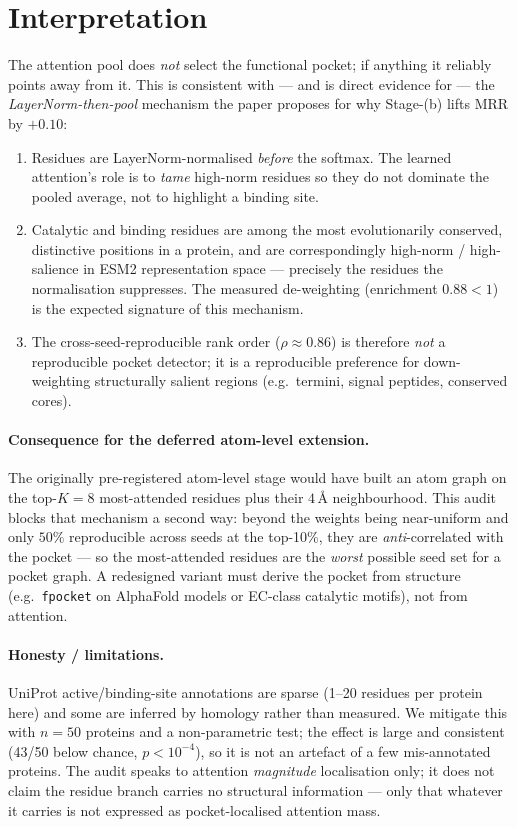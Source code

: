 \documentclass[11pt]{article}
\begin{document}
\section{Interpretation}

The attention pool does \emph{not} select the functional pocket; if anything it
reliably points away from it. This is consistent with --- and is direct
evidence for --- the \emph{LayerNorm-then-pool} mechanism the paper proposes
for why Stage-(b) lifts MRR by $+0.10$:

\begin{enumerate}\setlength\itemsep{2pt}
  \item Residues are LayerNorm-normalised \emph{before} the softmax. The
        learned attention's role is to \emph{tame} high-norm residues so they
        do not dominate the pooled average, not to highlight a binding site.
  \item Catalytic and binding residues are among the most evolutionarily
        conserved, distinctive positions in a protein, and are correspondingly
        high-norm / high-salience in ESM2 representation space --- precisely
        the residues the normalisation suppresses. The measured de-weighting
        (enrichment $0.88 < 1$) is the expected signature of this mechanism.
  \item The cross-seed-reproducible rank order ($\rho \approx 0.86$) is
        therefore \emph{not} a reproducible pocket detector; it is a
        reproducible preference for down-weighting structurally salient
        regions (e.g.\ termini, signal peptides, conserved cores).
\end{enumerate}

\paragraph{Consequence for the deferred atom-level extension.} The originally
pre-registered atom-level stage would have built an atom graph on the
top-$K{=}8$ most-attended residues plus their $4$\,\AA{} neighbourhood. This
audit blocks that mechanism a second way: beyond the weights being near-uniform
and only $50\%$ reproducible across seeds at the top-10\%, they are
\emph{anti}-correlated with the pocket --- so the most-attended residues are
the \emph{worst} possible seed set for a pocket graph. A redesigned variant
must derive the pocket from structure (e.g.\ \texttt{fpocket} on AlphaFold
models or EC-class catalytic motifs), not from attention.

\paragraph{Honesty / limitations.} UniProt active/binding-site annotations are
sparse (1--20 residues per protein here) and some are inferred by homology
rather than measured. We mitigate this with $n=50$ proteins and a non-parametric
test; the effect is large and consistent (43/50 below chance, $p<10^{-4}$), so
it is not an artefact of a few mis-annotated proteins. The audit speaks to
attention \emph{magnitude} localisation only; it does not claim the residue
branch carries no structural information --- only that whatever it carries is
not expressed as pocket-localised attention mass.
\end{document}
